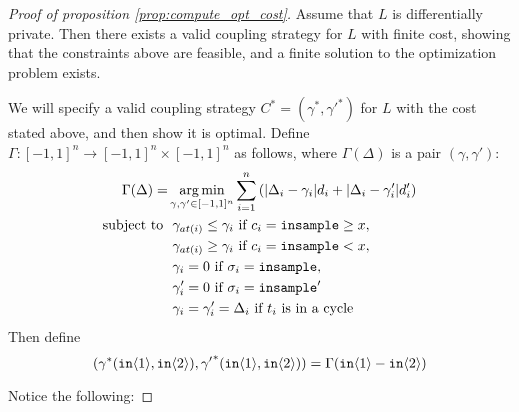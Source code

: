 \begin{proof}[Proof of proposition \ref{prop:compute_opt_cost}]
    Assume that $L$ is differentially private. Then there exists a valid coupling strategy for $L$ with finite cost, showing that the constraints above are feasible, and a finite solution to the optimization problem exists.  

    We will specify a valid coupling strategy $C^* = (\gamma^*, {\gamma'}^*)$ for $L$ with the cost stated above, and then show it is optimal. Define $\Gamma: [-1, 1]^n \to [-1, 1]^n \times [-1, 1]^n$ as follows, where $\Gamma(\Delta)$ is a pair $(\gamma, \gamma')$: 
    \begin{align*}
        \Gamma(\Delta) = &\operatorname*{arg\,min}_{\gamma, \gamma' \in [-1, 1]^n} \sum_{i = 1}^n \left(|\Delta_i - \gamma_i| d_i + |\Delta_i - \gamma_i'|d_i' \right)\\ 
        \text{subject to }
        &\ \gamma_{at(i)} \leq \gamma_i \text{ if } c_i = \texttt{insample}\geq x, \\
        &\ \gamma_{at(i)} \geq \gamma_i \text{ if } c_i = \texttt{insample} < x, \\
        &\ \gamma_i = 0 \text{ if } \sigma_i = \texttt{insample}, \\
        &\ \gamma_i' = 0 \text{ if } \sigma_i = \texttt{insample}'\\
        &\ \gamma_i = \gamma_i'= \Delta_i \text{ if } t_i \text{ is in a cycle}
    \end{align*}
    Then define \[(\gamma^*(\texttt{in}\langle1 \rangle, \texttt{in}\langle2 \rangle), {\gamma'}^*(\texttt{in}\langle1 \rangle, \texttt{in}\langle2 \rangle)) = \Gamma(\texttt{in}\langle1 \rangle - \texttt{in}\langle2 \rangle)\]

    Notice the following: 


\end{proof}
